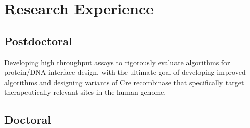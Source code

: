 \section{Research Experience}

\subsection{Postdoctoral}

\begin{description}[leftmargin=10mm, labelindent=5mm]

\item[Recombinase target specificity (Church lab, 2019 to present)]
      Developing high throughput assays to rigorously evaluate algorithms for 
      protein/DNA interface design, with the ultimate goal of developing 
      improved algorithms and designing variants of Cre recombinase that 
      specifically target therapeutically relevant sites in the human genome.

\end{description}

\subsection{Doctoral}

